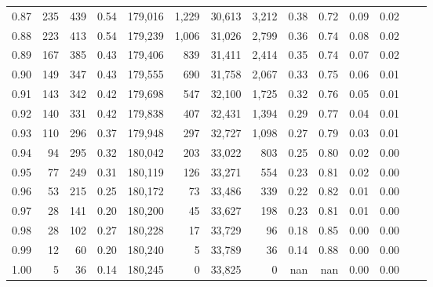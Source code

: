 \begin{tabular}{rrrrrrrrrrrrrr}
0.87 &    235 &  439 &    0.54 &  179,016 &    1,229 &  30,613 &   3,212 &  0.38 &  0.72 &  0.09 &      0.02 \\
0.88 &    223 &  413 &    0.54 &  179,239 &    1,006 &  31,026 &   2,799 &  0.36 &  0.74 &  0.08 &      0.02 \\
0.89 &    167 &  385 &    0.43 &  179,406 &      839 &  31,411 &   2,414 &  0.35 &  0.74 &  0.07 &      0.02 \\
0.90 &    149 &  347 &    0.43 &  179,555 &      690 &  31,758 &   2,067 &  0.33 &  0.75 &  0.06 &      0.01 \\
0.91 &    143 &  342 &    0.42 &  179,698 &      547 &  32,100 &   1,725 &  0.32 &  0.76 &  0.05 &      0.01 \\
0.92 &    140 &  331 &    0.42 &  179,838 &      407 &  32,431 &   1,394 &  0.29 &  0.77 &  0.04 &      0.01 \\
0.93 &    110 &  296 &    0.37 &  179,948 &      297 &  32,727 &   1,098 &  0.27 &  0.79 &  0.03 &      0.01 \\
0.94 &     94 &  295 &    0.32 &  180,042 &      203 &  33,022 &     803 &  0.25 &  0.80 &  0.02 &      0.00 \\
0.95 &     77 &  249 &    0.31 &  180,119 &      126 &  33,271 &     554 &  0.23 &  0.81 &  0.02 &      0.00 \\
0.96 &     53 &  215 &    0.25 &  180,172 &       73 &  33,486 &     339 &  0.22 &  0.82 &  0.01 &      0.00 \\
0.97 &     28 &  141 &    0.20 &  180,200 &       45 &  33,627 &     198 &  0.23 &  0.81 &  0.01 &      0.00 \\
0.98 &     28 &  102 &    0.27 &  180,228 &       17 &  33,729 &      96 &  0.18 &  0.85 &  0.00 &      0.00 \\
0.99 &     12 &   60 &    0.20 &  180,240 &        5 &  33,789 &      36 &  0.14 &  0.88 &  0.00 &      0.00 \\
1.00 &      5 &   36 &    0.14 &  180,245 &        0 &  33,825 &       0 &   nan &   nan &  0.00 &      0.00 \\
\bottomrule
\end{tabular}
